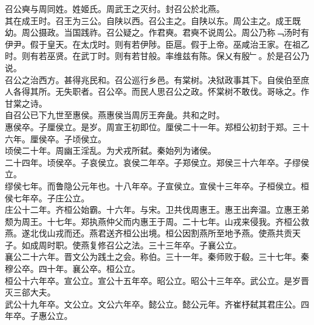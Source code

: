 \documentclass{zhvt-classic}
\begin{document}
\hspace*{2em}召公奭与周同姓。姓姬氏。周武王之灭纣。封召公於北燕。\\
\hspace*{2em}其在成王时。召王为三公。自陕以西。召公主之。自陕以东。周公主之。成王既幼。周公摄政。当国践祚。召公疑之。作君奭。君奭不说周公。周公乃称﹁汤时有伊尹。假于皇天。在太戊时。则有若伊陟。臣扈。假于上帝。巫咸治王家。在祖乙时。则有若巫贤。在武丁时。则有若甘般。率维兹有陈。保乂有殷﹂。於是召公乃说。\\
\hspace*{2em}召公之治西方。甚得兆民和。召公巡行乡邑。有棠树。决狱政事其下。自侯伯至庶人各得其所。无失职者。召公卒。而民人思召公之政。怀棠树不敢伐。哥咏之。作甘棠之诗。\\
\hspace*{2em}自召公已下九世至惠侯。燕惠侯当周厉王奔彘。共和之时。\\
\hspace*{2em}惠侯卒。子厘侯立。是岁。周宣王初即位。厘侯二十一年。郑桓公初封于郑。三十六年。厘侯卒。子顷侯立。\\
\hspace*{2em}顷侯二十年。周幽王淫乱。为犬戎所弑。秦始列为诸侯。\\
\hspace*{2em}二十四年。顷侯卒。子哀侯立。哀侯二年卒。子郑侯立。郑侯三十六年卒。子缪侯立。\\
\hspace*{2em}缪侯七年。而鲁隐公元年也。十八年卒。子宣侯立。宣侯十三年卒。子桓侯立。桓侯七年卒。子庄公立。\\
\hspace*{2em}庄公十二年。齐桓公始霸。十六年。与宋。卫共伐周惠王。惠王出奔温。立惠王弟颓为周王。十七年。郑执燕仲父而内惠王于周。二十七年。山戎来侵我。齐桓公救燕。遂北伐山戎而还。燕君送齐桓公出境。桓公因割燕所至地予燕。使燕共贡天子。如成周时职。使燕复修召公之法。三十三年卒。子襄公立。\\
\hspace*{2em}襄公二十六年。晋文公为践土之会。称伯。三十一年。秦师败于殽。三十七年。秦穆公卒。四十年。襄公卒。桓公立。\\
\hspace*{2em}桓公十六年卒。宣公立。宣公十五年卒。昭公立。昭公十三年卒。武公立。是岁晋灭三郤大夫。\\
\hspace*{2em}武公十九年卒。文公立。文公六年卒。懿公立。懿公元年。齐崔杼弑其君庄公。四年卒。子惠公立。\\
\end{document}
